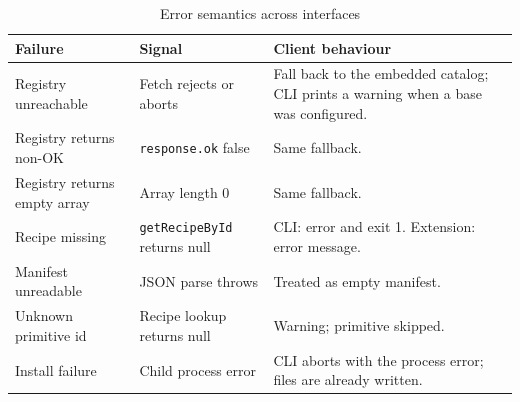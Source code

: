 \begin{longtable}{p{4.4cm}p{3.4cm}p{6.4cm}}
\caption{Error semantics across interfaces}\\
\toprule
\textbf{Failure} & \textbf{Signal} & \textbf{Client behaviour} \\
\midrule

Registry unreachable & Fetch rejects or aborts & Fall back to the embedded catalog;
CLI prints a warning when a base was configured. \\
Registry returns non-OK & \texttt{response.ok} false & Same fallback. \\
Registry returns empty array & Array length 0 & Same fallback. \\
Recipe missing & \texttt{getRecipeById} returns null & CLI: error and exit 1.
Extension: error message. \\
Manifest unreadable & JSON parse throws & Treated as empty manifest. \\
Unknown primitive id & Recipe lookup returns null & Warning; primitive skipped. \\
Install failure & Child process error & CLI aborts with the process error; files
are already written. \\
\bottomrule
\end{longtable}
